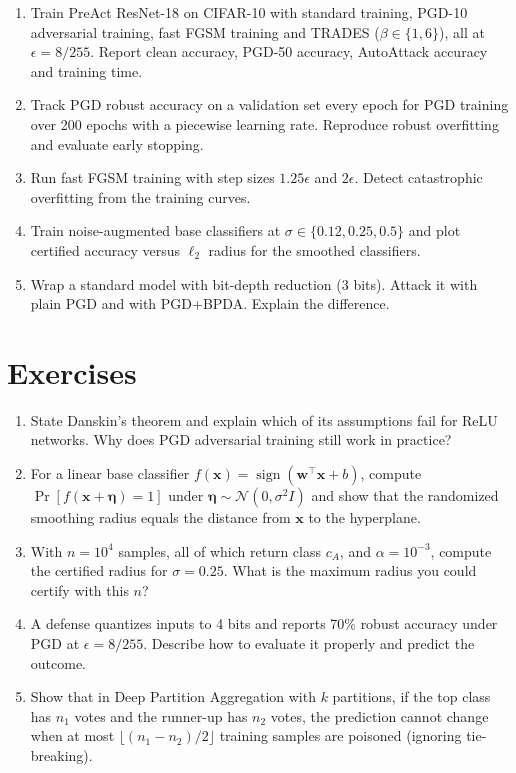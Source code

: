 \documentclass[10pt,a4paper]{extarticle}
\theoremstyle{definition}
\newcommand{\x}{\mathbf{x}}
\DeclareMathOperator{\sign}{sign}
\begin{document}
\begin{enumerate}[label=\textbf{\arabic*.}]
  \item Train PreAct ResNet-18 on CIFAR-10 with standard training, PGD-10 adversarial training, fast FGSM training and TRADES (\(\beta\in\{1,6\}\)), all at \(\epsilon=8/255\). Report clean accuracy, PGD-50 accuracy, AutoAttack accuracy and training time.
  \item Track PGD robust accuracy on a validation set every epoch for PGD training over 200 epochs with a piecewise learning rate. Reproduce robust overfitting and evaluate early stopping.
  \item Run fast FGSM training with step sizes \(1.25\epsilon\) and \(2\epsilon\). Detect catastrophic overfitting from the training curves.
  \item Train noise-augmented base classifiers at \(\sigma\in\{0.12,0.25,0.5\}\) and plot certified accuracy versus \(\ell_2\) radius for the smoothed classifiers.
  \item Wrap a standard model with bit-depth reduction (3 bits). Attack it with plain PGD and with PGD+BPDA. Explain the difference.
\end{enumerate}

\section*{Exercises}

\begin{enumerate}[label=\textbf{\arabic*.}]
  \item State Danskin's theorem and explain which of its assumptions fail for ReLU networks. Why does PGD adversarial training still work in practice?
  \item For a linear base classifier \(f(\x)=\sign(\mathbf{w}^\top\x+b)\), compute \(\Pr[f(\x+\boldsymbol{\eta})=1]\) under \(\boldsymbol{\eta}\sim\mathcal{N}(0,\sigma^2I)\) and show that the randomized smoothing radius equals the distance from \(\x\) to the hyperplane.
  \item With \(n=10^4\) samples, all of which return class \(c_A\), and \(\alpha=10^{-3}\), compute the certified radius for \(\sigma=0.25\). What is the maximum radius you could certify with this \(n\)?
  \item A defense quantizes inputs to 4 bits and reports 70\% robust accuracy under PGD at \(\epsilon=8/255\). Describe how to evaluate it properly and predict the outcome.
  \item Show that in Deep Partition Aggregation with \(k\) partitions, if the top class has \(n_1\) votes and the runner-up has \(n_2\) votes, the prediction cannot change when at most \(\lfloor(n_1-n_2)/2\rfloor\) training samples are poisoned (ignoring tie-breaking).
\end{enumerate}



\end{document}
